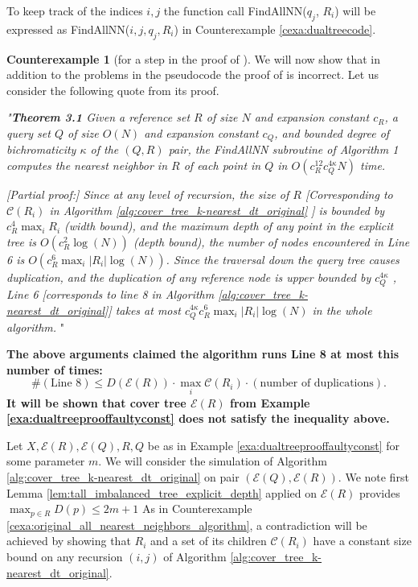 \documentclass{vgtc}                          %
\numberwithin{algocf}{section}
\theoremstyle{definition}
\theoremstyle{definition}
\theoremstyle{definition}
\newtheorem{cexa}[algocf]{Counterexample}
\theoremstyle{plain}
\newcommand{\C}{\mathcal{C}}
\newcommand{\T}{\mathcal{E}}
\begin{document}
\noindent
To keep track of the indices $i,j$ the function call FindAllNN($q_j$, $R_i$) will be expressed as FindAllNN($i,j,q_j, R_i$) in Counterexample \ref{cexa:dualtreecode}.


\begin{cexa}[for a step in the proof of {\cite[Theorem~3.1]{ram2009linear}} ]
	\label{cexa:dualtreeproof}
	We will now show that in addition to the problems in the pseudocode the proof of \cite[Theorem~3.1]{ram2009linear} is incorrect.  Let us consider the following quote from its proof. 
	
	\medskip
	\noindent
	\emph{"\textbf{Theorem 3.1} Given a reference set $R$ of size $N$ and expansion constant $c_R$, a query set $Q$ of size
	$O(N)$ and expansion constant $c_Q$, and bounded degree of bichromaticity $\kappa$ of the $(Q,R)$ pair, the
	FindAllNN subroutine of Algorithm 1 computes the nearest neighbor in $R$ of each point in $Q$ in
	$O(c^{12}_Rc^{4\kappa}_QN)$ time.}
	
	\medskip
	\noindent
	\emph{[\emph{Partial proof:}]
	Since at any level of recursion, the size of $R$ [Corresponding to $\C(R_i)$ in Algorithm \ref{alg:cover_tree_k-nearest_dt_original} ] is bounded by $c_R^4\max_i{R_i}$ (width bound), and the
	maximum depth of any point in the explicit tree is $O(c^2_R \log(N))$ (depth bound), the number of nodes
	encountered in Line 6 is $O(c_R^{6} \max_i |R_i|\log(N))$. Since the traversal down the query tree causes
	duplication, and the duplication of any reference node is upper bounded by $c_Q^{4\kappa}$ , Line 6 [corresponds to line 8 in Algorithm \ref{alg:cover_tree_k-nearest_dt_original}] takes at most
	$c^{4\kappa}_Qc^6_R\max_i|R_i|\log(N)$ in the whole algorithm. }
	"
	
	\medskip
	\noindent
	\textbf{The above arguments claimed the algorithm runs Line 8 at most this number of times:}
	\begin{equation}
		\label{eqa:AuthorClaimingDualTreeKNN}
		\#(\text{Line 8}) \leq D(\T(R)) \cdot \max_i \C(R_i)  \cdot (\text{number of duplications}).
	\end{equation}
	\textbf{It will be shown that cover tree $\T(R)$ from Example \ref{exa:dualtreeprooffaultyconst} does not satisfy the inequality above. }

\medskip	
\noindent	
	Let $X, \T(R), \T(Q), R, Q$ be as in Example \ref{exa:dualtreeprooffaultyconst} for some parameter $m$. We will consider the simulation of Algorithm \ref{alg:cover_tree_k-nearest_dt_original} on pair $(\T(Q),\T(R))$. We note first Lemma \ref{lem:tall_imbalanced_tree_explicit_depth} applied on $\T(R)$ provides $\max_{p \in R}D(p) \leq 2m+1$
As in Counterexample \ref{cexa:original_all_nearest_neighbors_algorithm}, a contradiction will be achieved by showing that $R_i$ and a set of its children $\C(R_i)$ have a constant size bound on any recursion $(i,j)$ of Algorithm \ref{alg:cover_tree_k-nearest_dt_original}.
	

\end{cexa}
\end{document}
